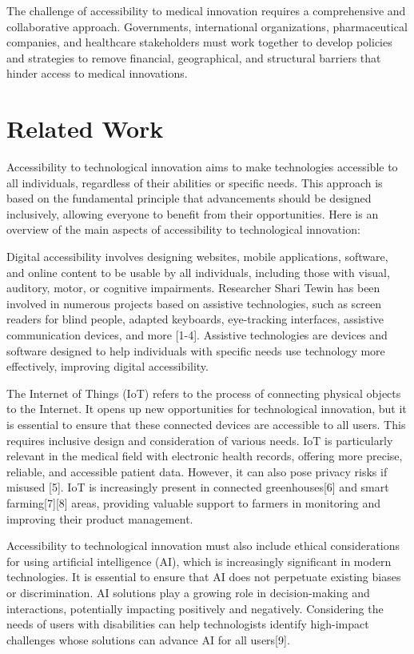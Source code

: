 The challenge of accessibility to medical innovation requires a comprehensive and collaborative approach. Governments, international organizations, pharmaceutical companies, and healthcare stakeholders must work together to develop policies and strategies to remove financial, geographical, and structural barriers that hinder access to medical innovations.

\section{Related Work}
Accessibility to technological innovation aims to make technologies accessible to all individuals, regardless of their abilities or specific needs. This approach is based on the fundamental principle that advancements should be designed inclusively, allowing everyone to benefit from their opportunities. Here is an overview of the main aspects of accessibility to technological innovation:

Digital accessibility involves designing websites, mobile applications, software, and online content to be usable by all individuals, including those with visual, auditory, motor, or cognitive impairments. Researcher Shari Tewin has been involved in numerous projects based on assistive technologies, such as screen readers for blind people, adapted keyboards, eye-tracking interfaces, assistive communication devices, and more  [1-4]. Assistive technologies are devices and software designed to help individuals with specific needs use technology more effectively, improving digital accessibility.

The Internet of Things (IoT) refers to the process of connecting physical objects to the Internet. It opens up new opportunities for technological innovation, but it is essential to ensure that these connected devices are accessible to all users. This requires inclusive design and consideration of various needs. IoT is particularly relevant in the medical field with electronic health records, offering more precise, reliable, and accessible patient data. However, it can also pose privacy risks if misused [5]. IoT is increasingly present in connected greenhouses[6] and smart farming[7][8] areas, providing valuable support to farmers in monitoring and improving their product management.

Accessibility to technological innovation must also include ethical considerations for using artificial intelligence (AI), which is increasingly significant in modern technologies. It is essential to ensure that AI does not perpetuate existing biases or discrimination. AI solutions play a growing role in decision-making and interactions, potentially impacting positively and negatively. Considering the needs of users with disabilities can help technologists identify high-impact challenges whose solutions can advance AI for all users[9].

